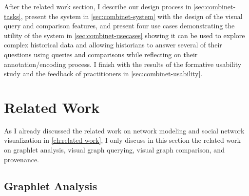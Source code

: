 After the related work section, I describe our design process in \autoref{sec:combinet-tasks}, present the system \name in \autoref{sec:combinet-system} with the design of the visual query and comparison features, and present four use cases demonstrating the utility of the system in \autoref{sec:combinet-usecases} showing it can be used to explore complex historical data and allowing historians to answer several of their questions using queries and comparisons while reflecting on their annotation/encoding process.
I finish with the results of the formative usability study and the feedback of practitioners in \autoref{sec:combinet-usability}.

\section{Related Work}\label{sec:combinet:related-work}

As I already discussed the related work on network modeling and social network visualization in \autoref{ch:related-work}, I only discuss in this section the related work on graphlet analysis, visual graph querying, visual graph comparison, and provenance.

\subsection{Graphlet Analysis}

